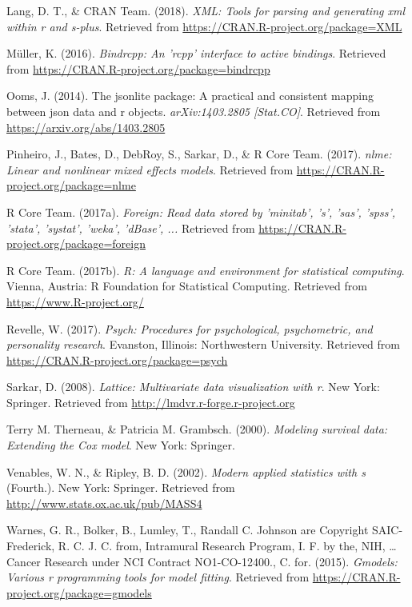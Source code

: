\documentclass[english,man]{apa6}
\theoremstyle{definition}
\theoremstyle{definition}
\theoremstyle{definition}
\theoremstyle{remark}
\begin{document}
\hypertarget{ref-R-XML}{}
Lang, D. T., \& CRAN Team. (2018). \emph{XML: Tools for parsing and
generating xml within r and s-plus}. Retrieved from
\url{https://CRAN.R-project.org/package=XML}

\hypertarget{ref-R-bindrcpp}{}
Müller, K. (2016). \emph{Bindrcpp: An 'rcpp' interface to active
bindings}. Retrieved from
\url{https://CRAN.R-project.org/package=bindrcpp}

\hypertarget{ref-R-jsonlite}{}
Ooms, J. (2014). The jsonlite package: A practical and consistent
mapping between json data and r objects. \emph{arXiv:1403.2805
{[}Stat.CO{]}}. Retrieved from \url{https://arxiv.org/abs/1403.2805}

\hypertarget{ref-R-nlme}{}
Pinheiro, J., Bates, D., DebRoy, S., Sarkar, D., \& R Core Team. (2017).
\emph{nlme: Linear and nonlinear mixed effects models}. Retrieved from
\url{https://CRAN.R-project.org/package=nlme}

\hypertarget{ref-R-foreign}{}
R Core Team. (2017a). \emph{Foreign: Read data stored by 'minitab', 's',
'sas', 'spss', 'stata', 'systat', 'weka', 'dBase', ...} Retrieved from
\url{https://CRAN.R-project.org/package=foreign}

\hypertarget{ref-R-base}{}
R Core Team. (2017b). \emph{R: A language and environment for
statistical computing}. Vienna, Austria: R Foundation for Statistical
Computing. Retrieved from \url{https://www.R-project.org/}

\hypertarget{ref-R-psych}{}
Revelle, W. (2017). \emph{Psych: Procedures for psychological,
psychometric, and personality research}. Evanston, Illinois:
Northwestern University. Retrieved from
\url{https://CRAN.R-project.org/package=psych}

\hypertarget{ref-R-lattice}{}
Sarkar, D. (2008). \emph{Lattice: Multivariate data visualization with
r}. New York: Springer. Retrieved from
\url{http://lmdvr.r-forge.r-project.org}

\hypertarget{ref-R-survival-book}{}
Terry M. Therneau, \& Patricia M. Grambsch. (2000). \emph{Modeling
survival data: Extending the Cox model}. New York: Springer.

\hypertarget{ref-R-MASS}{}
Venables, W. N., \& Ripley, B. D. (2002). \emph{Modern applied
statistics with s} (Fourth.). New York: Springer. Retrieved from
\url{http://www.stats.ox.ac.uk/pub/MASS4}

\hypertarget{ref-R-gmodels}{}
Warnes, G. R., Bolker, B., Lumley, T., Randall C. Johnson are Copyright
SAIC-Frederick, R. C. J. C. from, Intramural Research Program, I. F. by
the, NIH, \ldots{} Cancer Research under NCI Contract NO1-CO-12400., C.
for. (2015). \emph{Gmodels: Various r programming tools for model
fitting}. Retrieved from
\url{https://CRAN.R-project.org/package=gmodels}
\end{document}

